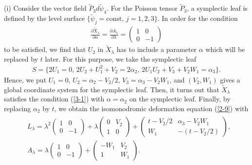\documentclass[pdftex]{sigma}
\numberwithin{equation}{section}
\begin{document}
(i) Consider the vector f\/ield $\widetilde{P}_3 d\widetilde{\psi}_4$. For the Poisson tensor $\widetilde{P}_3$, a symplectic leaf is def\/ined by the level surface $\{ \widetilde{\psi}_j = \text{const},\, j=1,2,3\}$. In order for the condition
\begin{gather}
\frac{\partial \widetilde{X}_\lambda }{\partial \alpha } = \frac{\partial A_\lambda }{\partial \lambda } = \left(
\begin{matrix}
1 & 0 \\
0 & -1
\end{matrix}
\right) \label{3-1}
\end{gather}
to be satisf\/ied, we f\/ind that $U_2$ in $\widetilde{X}_\lambda $ has to include a parameter $\alpha $ which will be replaced by $t$ later.
For this purpose, we take the symplectic leaf
\begin{gather*}
S = \big\{ 2U_1 = 0,\, 2U_2+U_1^2+V_2 = 2\alpha _2 ,\, 2U_1U_2 + V_3 + V_2W_1 = \alpha _3 \big\}.
\end{gather*}
Hence, we put $U_1 = 0$, $U_2 = \alpha _2 - V_2/2$, $V_3 = \alpha _3 - V_2W_1$, and $(V_2, W_1)$ gives a global coordinate system for the symplectic leaf. Then, it turns out that $\widetilde{X}_\lambda $ satisf\/ies the condition (\ref{3-1}) with $\alpha =\alpha _2$ on the symplectic leaf. Finally, by replacing $\alpha _2$ by $t$, we obtain the isomonodromic deformation equation (\ref{2-9}) with
\begin{gather*}
\begin{split}
& L_\lambda = \lambda ^2 \left(
\begin{matrix}
1 & 0 \\
0 & -1
\end{matrix}
\right) + \lambda \left(
\begin{matrix}
0 & V_2 \\
1 & 0
\end{matrix}
\right) + \left(
\begin{matrix}
t-V_2/2 & \alpha _3 - V_2W_1 \\
W_1 & -(t-V_2/2)
\end{matrix}
\right), \\
& A_\lambda = \lambda \left(
\begin{matrix}
1 & 0 \\
0 & -1
\end{matrix}
\right) + \left(
\begin{matrix}
-W_1 & V_2 \\
1 & W_1
\end{matrix}
\right).
\end{split}
\end{gather*}
\end{document}
